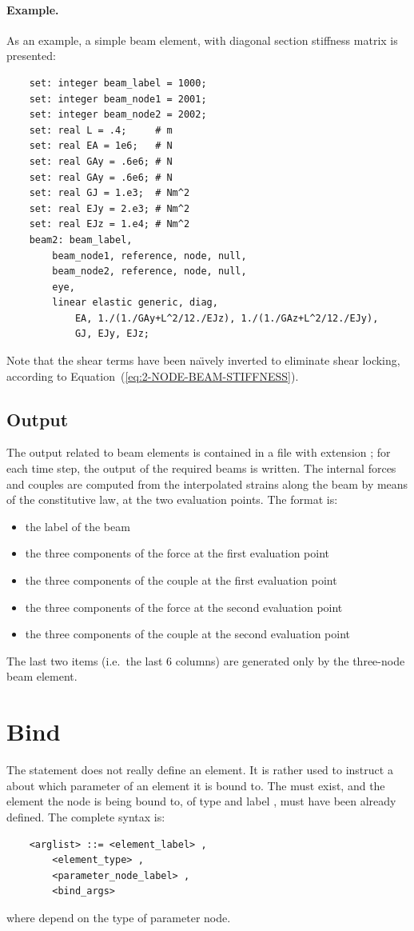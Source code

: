 \paragraph{Example.}
As an example, a simple beam element, with diagonal section stiffness 
matrix is presented:
\begin{verbatim}
    set: integer beam_label = 1000;
    set: integer beam_node1 = 2001;
    set: integer beam_node2 = 2002;
    set: real L = .4;     # m
    set: real EA = 1e6;   # N
    set: real GAy = .6e6; # N
    set: real GAy = .6e6; # N
    set: real GJ = 1.e3;  # Nm^2
    set: real EJy = 2.e3; # Nm^2
    set: real EJz = 1.e4; # Nm^2
    beam2: beam_label,
        beam_node1, reference, node, null,
        beam_node2, reference, node, null,
        eye,
        linear elastic generic, diag,
            EA, 1./(1./GAy+L^2/12./EJz), 1./(1./GAz+L^2/12./EJy),
            GJ, EJy, EJz;
\end{verbatim}
Note that the shear terms have been na\"{\i}vely inverted to eliminate
shear locking, according to Equation~(\ref{eq:2-NODE-BEAM-STIFFNESS}).

\subsection{Output}
The output related to beam elements is contained in a file with extension 
; for each time step, the output of the required beams is
written.
The internal forces and couples are computed from the interpolated strains
along the beam by means of the constitutive law, at the two evaluation
points. 
The format is:
\begin{itemize}
    \item the label of the beam
    \item the three components of the force at the first evaluation point
    \item the three components of the couple at the first evaluation point
    \item the three components of the force at the second evaluation point
    \item the three components of the couple at the second evaluation point    
\end{itemize}
The last two items (i.e.\ the last 6 columns) are generated
only by the three-node beam element.



\section{Bind}\label{sec:EL:BIND}
The statement  does not really define an element.
It is rather used to instruct a
about which parameter of an element it is bound to.
The  must exist, and the element the node 
is being bound to, of type  and label ,
must have been already defined.
The complete syntax is:
\begin{verbatim}
    <arglist> ::= <element_label> , 
        <element_type> ,
        <parameter_node_label> , 
        <bind_args>
\end{verbatim}
where  depend on the type of parameter node.

